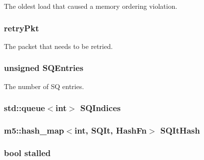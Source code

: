 \label{classOzoneLWLSQ_a270a20c3fa52139e0538288275db9d22}
The oldest load that caused a memory ordering violation. \hypertarget{classOzoneLWLSQ_a314ae93c04b3ca96e79e1b1f39a8e478}{
\subsubsection[{retryPkt}]{ {\bf retryPkt}}}
\label{classOzoneLWLSQ_a314ae93c04b3ca96e79e1b1f39a8e478}
The packet that needs to be retried. \hypertarget{classOzoneLWLSQ_a38c8af5392da70119dc5cce4e3637cbc}{
\subsubsection[{SQEntries}]{\setlength{\rightskip}{0pt plus 5cm}unsigned {\bf SQEntries}}}
\label{classOzoneLWLSQ_a38c8af5392da70119dc5cce4e3637cbc}
The number of SQ entries. \hypertarget{classOzoneLWLSQ_a94838aca72c880423d2328ae17f065e6}{
\subsubsection[{SQIndices}]{\setlength{\rightskip}{0pt plus 5cm}std::queue$<$int$>$ {\bf SQIndices}}}
\label{classOzoneLWLSQ_a94838aca72c880423d2328ae17f065e6}
\hypertarget{classOzoneLWLSQ_a3eb9bc9d55fde5b98e8d28a220d247f6}{
\subsubsection[{SQItHash}]{\setlength{\rightskip}{0pt plus 5cm}m5::hash\_\-map$<$int, {\bf SQIt}, {\bf HashFn}$>$ {\bf SQItHash}}}
\label{classOzoneLWLSQ_a3eb9bc9d55fde5b98e8d28a220d247f6}
\hypertarget{classOzoneLWLSQ_a6f8bff553ad30865c7d0c62e05421eb8}{
\subsubsection[{stalled}]{\setlength{\rightskip}{0pt plus 5cm}bool {\bf stalled}}}
